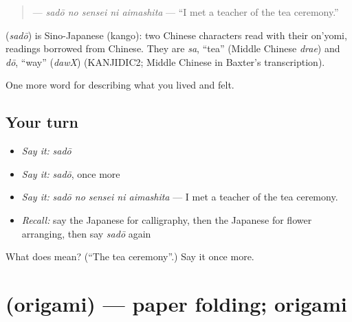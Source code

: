 \begin{quote}
\textbf{  } — \emph{sadō no sensei ni aimashita} — \textquotedblleft{}I met a teacher of the tea ceremony.\textquotedblright{}
\end{quote}

\begin{cousinweb}
\textbf{} (\emph{sadō}) is Sino-Japanese (kango): two Chinese characters read with their on'yomi, readings borrowed from Chinese. They are \emph{sa}, \textquotedblleft{}tea\textquotedblright{} (Middle Chinese \emph{drae}) and \emph{dō}, \textquotedblleft{}way\textquotedblright{} (\emph{dawX}) (KANJIDIC2; Middle Chinese in Baxter's transcription).
\end{cousinweb}

\begin{grammarlens}[title={What you've built}]
One more word for describing what you lived and felt.
\end{grammarlens}

\subsection*{Your turn}
\begin{itemize}
\raggedright
  \item \emph{Say it:} \emph{sadō}
  \item \emph{Say it:} \emph{sadō}, once more
  \item \emph{Say it:} \emph{sadō no sensei ni aimashita} — I met a teacher of the tea ceremony.
  \item \emph{Recall:} say the Japanese for calligraphy, then the Japanese for flower arranging, then say \emph{sadō} again
\end{itemize}

\begin{tcolorbox}[breakable,colback=teal!4,colframe=teal!35!black,title={Before you move on}]
What does  mean? (\textquotedblleft{}The tea ceremony\textquotedblright{}.) Say it once more.
\end{tcolorbox}
\section[\texorpdfstring{\ja{おりがみ} (origami)}{おりがみ (origami)}]{ (origami) — paper folding; origami}

\label{lesson:JA-C466-origami}



